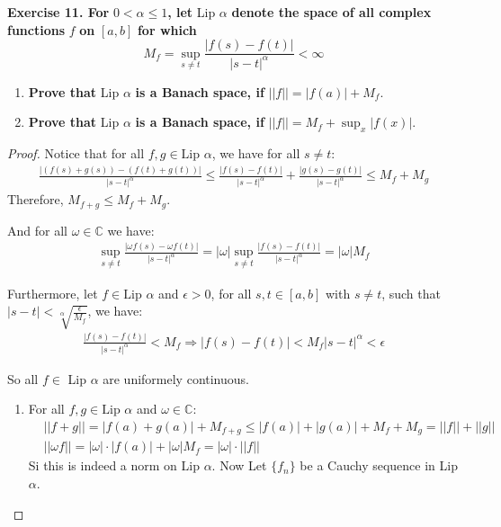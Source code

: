 \documentclass{article}
\newcommand{\C}{\mathbb{C}}
\theoremstyle{definition}
\theoremstyle{remark}
\theoremstyle{definition}
\begin{document}
    \textbf{Exercise 11. For }$0<\alpha\leq 1$\textbf{, let }Lip $\alpha$\textbf{ denote the space of all complex functions }$f$
    \textbf{ on }$[a,b]$\textbf{ for which }\begin{equation*}
        M_f = \sup_{s\neq t}\frac{|f(s)-f(t)|}{|s-t|^\alpha}<\infty
    \end{equation*}
    \begin{enumerate}[label = (\alph*)]
        \item \textbf{Prove that }Lip $\alpha$ \textbf{ is a Banach space, if }$||f|| = |f(a)|+M_f$.
        \item \textbf{Prove that }Lip $\alpha$ \textbf{ is a Banach space, if }$||f|| = M_f+\sup_x|f(x)|$.
    \end{enumerate}
\begin{proof}
    Notice that for all $f,g\in \text{Lip }\alpha$, we have for all $s\neq t$:\begin{align*}
        \frac{|(f(s)+g(s)) - (f(t)+g(t))|}{|s-t|^\alpha}\leq \frac{|f(s)-f(t)|}{|s-t|^\alpha}+\frac{|g(s)-g(t)|}{|s-t|^\alpha}\leq M_f+M_g 
    \end{align*}
    Therefore, $M_{f+g}\leq M_f+M_g$.

    And for all $\omega\in \C$ we have:\begin{align*}
        \sup_{s\neq t}\frac{|\omega f(s)-\omega f(t)|}{|s-t|^\alpha} = |\omega|\sup_{s\neq t}\frac{|f(s)-f(t)|}{|s-t|^\alpha} = |\omega|M_f
    \end{align*}

    Furthermore, let $f\in \text{Lip }\alpha$ and $\epsilon>0$, for all $s,t\in [a,b]$ with $s\neq t$, such that $|s-t|<\sqrt[\alpha]{\frac{\epsilon}{M_f}}$, we have:\begin{align*}
     \frac{|f(s)-f(t)|}{|s-t|^\alpha}< M_f \Rightarrow |f(s)-f(t)|<M_f|s-t|^\alpha <\epsilon
    \end{align*}

    So all $f\in$ Lip $\alpha$ are uniformely continuous.

    \begin{enumerate}[label = (\alph*)]
        \item For all $f,g\in \text{Lip }\alpha$ and $\omega\in \C$:\begin{align*}
            &||f+g|| = |f(a)+g(a)| + M_{f+g}\leq |f(a)| + |g(a)| + M_f+M_g = ||f||+||g||\\
            &||\omega f|| = |\omega|\cdot|f(a)|+|\omega| M_f = |\omega|\cdot ||f||
        \end{align*}
        Si this is indeed a norm on Lip $\alpha$. Now Let $\{f_n\}$ be a Cauchy sequence in Lip $\alpha$.


\end{enumerate}
\end{proof}
\end{document}
